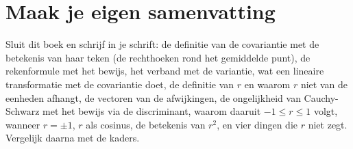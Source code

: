 
\begin{oefeningen}






\end{oefeningen}


\ifzelfstudie
\section*{Maak je eigen samenvatting}
Sluit dit boek en schrijf in je schrift: de definitie van de covariantie met de betekenis van haar teken (de rechthoeken rond het gemiddelde punt), de rekenformule met het bewijs, het verband met de variantie, wat een lineaire transformatie met de covariantie doet, de definitie van $r$ en waarom $r$ niet van de eenheden afhangt, de vectoren van de afwijkingen, de ongelijkheid van Cauchy-Schwarz met het bewijs via de discriminant, waarom daaruit $-1 \leqslant r \leqslant 1$ volgt, wanneer $r = \pm 1$, $r$ als cosinus, de betekenis van $r^2$, en vier dingen die $r$ niet zegt. Vergelijk daarna met de kaders.
\fi
